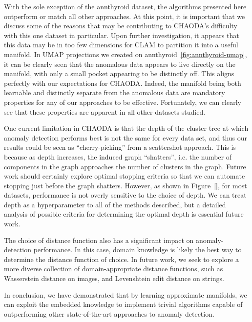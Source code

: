 With the sole exception of the annthyroid dataset, the algorithms presented here outperform or match all other approaches. 
At this point, it is important that we discuss some of the reasons that may be contributing to CHAODA's difficulty with this one dataset in particular.
Upon further investigation, it appears that this data may be in too few dimensions for CLAM to partition it into a useful manifold.
In UMAP projections we created on annthyroid~\ref{fig:annthyroid-umap}, it can be clearly seen that the anomalous data appears to live directly on the manifold, with only a small pocket appearing to be distinctly off.
This aligns perfectly with our expectations for CHAODA.
Indeed, the manifold being both learnable and distinctly separate from the anomalous data are mandatory properties for any of our approaches to be effective.
Fortunately, we can clearly see that these properties are apparent in all other datasets studied.

One current limitation in CHAODA is that the depth of the cluster tree at which anomaly detection performs best is not the same for every data set, and thus our results could be seen as ``cherry-picking'' from a scattershot approach.
This is because as depth increases, the induced graph ``shatters'', i.e. the number of components in the graph approaches the number of clusters in the graph.
Future work should certainly explore optimal stopping criteria so that we can automate stopping just before the graph shatters.
However, as shown in Figure~\ref{}, for most datasets, performance is not overly sensitive to the choice of depth.
We can treat depth as a hyperparameter to all of the methods described, but a detailed analysis of possible criteria for determining the optimal depth is essential future work.


The choice of distance function also has a significant impact on anomaly-detection performance.
In this case, domain knowledge is likely the best way to determine the distance function of choice.
In future work, we seek to explore a more diverse collection of domain-appropriate distance functions, such as Wasserstein distance on images, and Levenshtein edit distance on strings. 


In conclusion, we have demonstrated that by learning approximate manifolds, we can exploit the embedded knowledge to implement trivial algorithms capable of outperforming other state-of-the-art approaches to anomaly detection.
